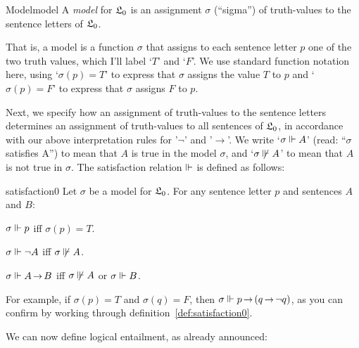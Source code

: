 \begin{definition}{Model}{model}
  A \emph{model} for $\mathfrak{L}_0$ is an assignment $\sigma$ (``sigma'') of truth-values to
  the sentence letters of $\mathfrak{L}_0$.
\end{definition}

That is, a model is a function $\sigma$ that
assigns to each sentence letter $p$ one of the two truth values,
which I'll label `$T$' and `$F$'.
We use standard function notation here, using
`$\sigma(p) = T$' to express that $\sigma$ assigns the value $T$ to $p$
and `$\sigma(p) = F$' to express that $\sigma$ assigns $F$ to $p$.

Next,
we specify how
an assignment of truth-values to the sentence letters determines
an assignment of truth-values to all sentences of $\mathfrak{L}_0$,
in accordance with our above interpretation rules for '$\neg$' and '$\to$'.
We write `$\sigma \Vdash A$'
(read: ``$\sigma$ satisfies A'')
to mean that $A$ is true in the model $\sigma$,
and `$\sigma \not\Vdash A$' to mean that $A$ is not true in $\sigma$.
The satisfaction relation $\Vdash$ is defined as follows:

\begin{definition}{}{satisfaction0}
  Let $\sigma$ be a model for $\mathfrak{L}_0$.
  For any sentence letter $p$ and sentences $A$ and $B$:
  \begin{cenumerate}
    \item[(i)] $\sigma \Vdash p$ iff $\sigma(p) = T$.
    \item[(ii)] $\sigma \Vdash \neg A$ iff $\sigma \not\Vdash A$.
    \item[(iii)] $\sigma \satisfies A \to B$ iff $\sigma \not\Vdash A$ or $\sigma \Vdash B$.
  \end{cenumerate}
\end{definition}

For example,
if $\sigma(p) = T$ and $\sigma(q) = F$,
then $\sigma \satisfies p \to (q \to \neg q)$,
as you can confirm by working through definition~\ref{def:satisfaction0}.

We can now define logical entailment, as already announced:

